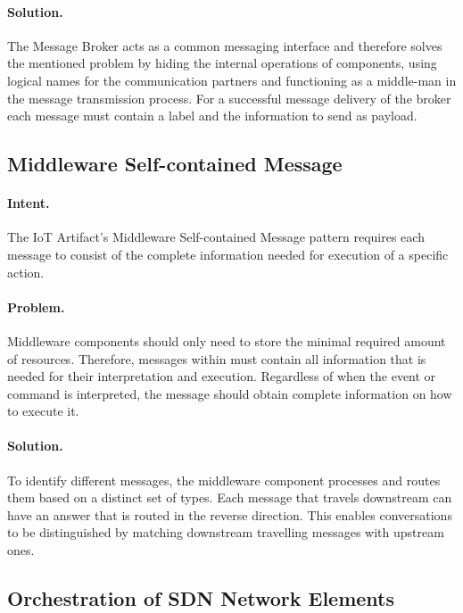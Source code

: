 \paragraph{\textbf{Solution.}} The Message Broker acts as a common messaging interface and therefore solves the mentioned problem by hiding the internal operations of components, using logical names for the communication partners and functioning as a middle-man in the message transmission process. For a successful message delivery of the broker each message must contain a label and the information to send as payload. 


\subsection{Middleware Self-contained Message~\cite{Tkaczyk2018}} 
\label{p:scmessage}

\paragraph{\textbf{Intent.}} The IoT Artifact's Middleware Self-contained Message pattern requires each message to consist of the complete information needed for execution of a specific action.

\paragraph{\textbf{Problem.}} Middleware components should only need to store the minimal required amount of resources. Therefore, messages within must contain all information that is needed for their interpretation and execution. Regardless of when the event or command is interpreted, the message should obtain complete information on how to execute it. 

\paragraph{\textbf{Solution.}} To identify different messages, the middleware component processes and routes them based on a distinct set of types. Each message that travels downstream can have an answer that is routed in the reverse direction. This enables conversations to be distinguished by matching downstream travelling messages with upstream ones.


\subsection{Orchestration of SDN Network Elements~\cite{Tkaczyk2018}} 
\label{p:sdn}

